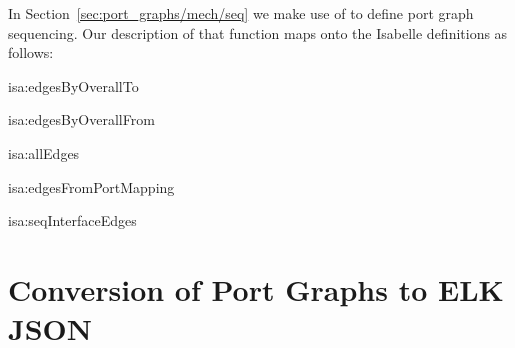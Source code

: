 \documentclass[class=smolathesis,crop=false]{standalone}
\begin{document}
In Section~\ref{sec:port_graphs/mech/seq} we make use of  to define port graph sequencing.
Our description of that function maps onto the Isabelle definitions as follows:
\begin{isadef}{isa:edgesByOverallTo}
  
\end{isadef}
\begin{isadef}{isa:edgesByOverallFrom}
  
\end{isadef}
\begin{isadef}{isa:allEdges}
  
\end{isadef}
\begin{isadef}{isa:edgesFromPortMapping}
  
\end{isadef}
\begin{isadef}{isa:seqInterfaceEdges}
  
\end{isadef}

\section{Conversion of Port Graphs to ELK JSON}
\label{app:elk_export}
\end{document}
